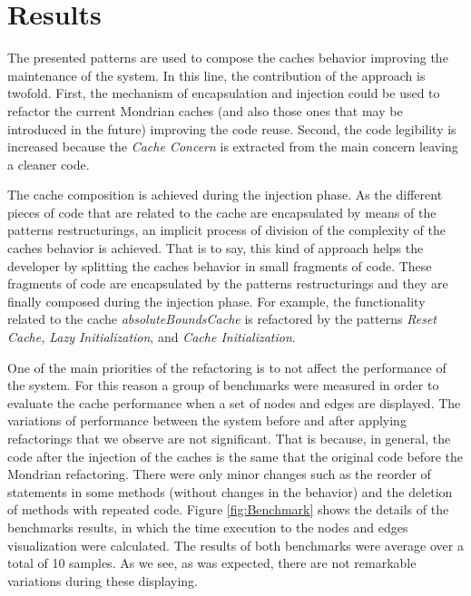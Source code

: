 \documentclass[preprint,10pt]{sigplanconf}
\newcommand{\seclabel}[1]{\label{sec:#1}}
\begin{document}
\section{Results}\seclabel{results}

The presented patterns are used to compose the caches
behavior improving the maintenance of the system. In this line, the
contribution of the approach is twofold. First, the mechanism of encapsulation
and injection could be used to refactor the current Mondrian caches
(and also those ones that may be introduced in the future) improving the code
reuse. Second, the code legibility is increased because the \emph{Cache
Concern} is extracted from the main concern leaving a cleaner code.

The cache composition is achieved during the injection phase. As the
different pieces of code that are related to the cache are encapsulated
by means of the patterns restructurings, an implicit process of division of the complexity
of the caches behavior is achieved. That is to say, this kind of approach
helps the developer by splitting the caches behavior in small fragments
of code. These fragments of code are encapsulated by the patterns restructurings
and they are finally composed during the injection phase. For example,
the functionality related to the cache \emph{absoluteBoundsCache}
is refactored by the patterns \emph{Reset Cache,} \emph{Lazy Initialization}, and \emph{Cache Initialization}.

One of the main priorities of the refactoring is to not affect the performance of the system. 
For this reason a group of benchmarks were measured in order to evaluate the cache performance when a set of nodes and edges are displayed. The variations of performance between the system before and after applying refactorings that we observe are not significant. That is because, in general, the code after the injection of the caches is the same that the original code before the Mondrian refactoring. There were only minor changes such as the reorder of statements in some methods (without changes in the behavior) and the deletion of methods with repeated code. Figure \ref{fig:Benchmark} shows the details of the benchmarks results, in which the time execution to the nodes and edges visualization were calculated. The results of both benchmarks were average over a total of 10 samples. As we see, as was expected, there are not remarkable variations during these displaying.
\end{document}
